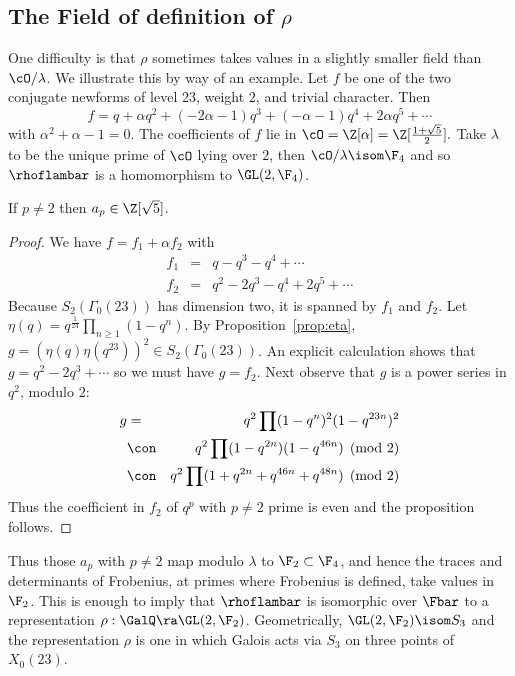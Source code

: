 \documentclass{report}
\begin{document}
\subsection{The Field of definition of $\rho$}
One difficulty is that $\rho$ sometimes takes values in a
slightly smaller field than $\cO/\lambda$.
We illustrate this by way of an example.
Let $f$ be one of the two conjugate newforms of
level $23$, weight $2$, and trivial character.
Then
$$ f = q + \alpha{}q^2 + (-2\alpha-1)q^3 + (-\alpha-1)q^4 + 2\alpha{}q^5 + \cdots $$
with $\alpha^2+\alpha-1=0$.
The coefficients of $f$ lie in $\cO=\Z[\alpha]=\Z[\frac{1+\sqrt{5}}{2}].$
Take $\lambda$ to be the unique prime of $\cO$ lying over $2$,
then $\cO/\lambda\isom\F_4$ and so $\rhoflambar$ is a homomorphism
to $\GL(2,\F_4)$.
\begin{proposition}
If $p\neq 2$ then $a_p\in\Z[\sqrt{5}]$.
\end{proposition}
\begin{proof}
We have $ f = f_1 + \alpha{} f_2$
with
\begin{eqnarray*}
 f_1 &=& q -q^3 -q^4 + \cdots \\
 f_2 &=& q^2 -2q^3 -q^4 + 2q^5 + \cdots
\end{eqnarray*}
Because $S_2(\Gamma_0(23))$ has dimension two, it is
spanned by $f_1$ and $f_2$.
Let $\eta(q)=q^{\frac{1}{24}}\prod_{n\geq 1}(1-q^n)$.
By Proposition~\ref{prop:eta},
$g=(\eta(q)\eta(q^{23}))^2\in S_2(\Gamma_0(23))$.
An explicit calculation shows that
$g= q^2 - 2q^3 +\cdots$ so we must have $g=f_2$.
Next observe that $g$ is a power series in $q^2$, modulo $2$:
\begin{eqnarray*}
   g &=& q^2\prod(1-q^n)^2(1-q^{23n})^2 \\
     &\con& q^2\prod(1-q^{2n})(1-q^{46n}) \pmod{2}\\
     &\con& q^2\prod(1+q^{2n}+ q^{46n}+q^{48n}) \pmod{2}
\end{eqnarray*}
Thus the coefficient in $f_2$ of $q^p$ with $p\neq 2$ prime is even
and the proposition follows.
\end{proof}
Thus those $a_p$ with $p\neq 2$  map
modulo $\lambda$ to $\F_2\subset\F_4$,
and hence the traces and determinants of Frobenius, at primes where
Frobenius is defined, take values in $\F_2$.
This is enough to imply that $\rhoflambar$
is isomorphic over $\Fbar$ to a representation
$\rho:\GalQ\ra\GL(2,\F_2)$.
Geometrically, $\GL(2,\F_2)\isom S_3$ and the
representation $\rho$ is one in which Galois
acts via $S_3$ on three points of $X_0(23)$.
\end{document}
